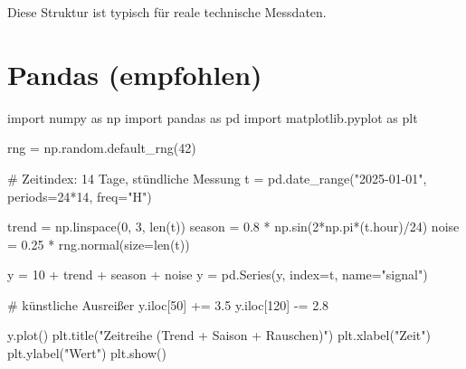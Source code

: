 \documentclass[
  ngerman,
  letterpaper,
  DIV=11]{scrreprt}
\newenvironment{Shaded}{\begin{snugshade}}{\end{snugshade}}
\newcommand{\BuiltInTok}[1]{\textcolor[rgb]{0.00,0.23,0.31}{#1}}
\newcommand{\CommentTok}[1]{\textcolor[rgb]{0.37,0.37,0.37}{#1}}
\newcommand{\DecValTok}[1]{\textcolor[rgb]{0.68,0.00,0.00}{#1}}
\newcommand{\FloatTok}[1]{\textcolor[rgb]{0.68,0.00,0.00}{#1}}
\newcommand{\ImportTok}[1]{\textcolor[rgb]{0.00,0.46,0.62}{#1}}
\newcommand{\NormalTok}[1]{\textcolor[rgb]{0.00,0.23,0.31}{#1}}
\newcommand{\OperatorTok}[1]{\textcolor[rgb]{0.37,0.37,0.37}{#1}}
\newcommand{\StringTok}[1]{\textcolor[rgb]{0.13,0.47,0.30}{#1}}
\begin{document}
Diese Struktur ist typisch für reale technische Messdaten.

\section{Pandas (empfohlen)}

\begin{Shaded}
\begin{Highlighting}[]
\ImportTok{import}\NormalTok{ numpy }\ImportTok{as}\NormalTok{ np}
\ImportTok{import}\NormalTok{ pandas }\ImportTok{as}\NormalTok{ pd}
\ImportTok{import}\NormalTok{ matplotlib.pyplot }\ImportTok{as}\NormalTok{ plt}

\NormalTok{rng }\OperatorTok{=}\NormalTok{ np.random.default\_rng(}\DecValTok{42}\NormalTok{)}

\CommentTok{\# Zeitindex: 14 Tage, stündliche Messung}
\NormalTok{t }\OperatorTok{=}\NormalTok{ pd.date\_range(}\StringTok{"2025{-}01{-}01"}\NormalTok{, periods}\OperatorTok{=}\DecValTok{24}\OperatorTok{*}\DecValTok{14}\NormalTok{, freq}\OperatorTok{=}\StringTok{"H"}\NormalTok{)}

\NormalTok{trend }\OperatorTok{=}\NormalTok{ np.linspace(}\DecValTok{0}\NormalTok{, }\DecValTok{3}\NormalTok{, }\BuiltInTok{len}\NormalTok{(t))}
\NormalTok{season }\OperatorTok{=} \FloatTok{0.8} \OperatorTok{*}\NormalTok{ np.sin(}\DecValTok{2}\OperatorTok{*}\NormalTok{np.pi}\OperatorTok{*}\NormalTok{(t.hour)}\OperatorTok{/}\DecValTok{24}\NormalTok{)}
\NormalTok{noise }\OperatorTok{=} \FloatTok{0.25} \OperatorTok{*}\NormalTok{ rng.normal(size}\OperatorTok{=}\BuiltInTok{len}\NormalTok{(t))}

\NormalTok{y }\OperatorTok{=} \DecValTok{10} \OperatorTok{+}\NormalTok{ trend }\OperatorTok{+}\NormalTok{ season }\OperatorTok{+}\NormalTok{ noise}
\NormalTok{y }\OperatorTok{=}\NormalTok{ pd.Series(y, index}\OperatorTok{=}\NormalTok{t, name}\OperatorTok{=}\StringTok{"signal"}\NormalTok{)}

\CommentTok{\# künstliche Ausreißer}
\NormalTok{y.iloc[}\DecValTok{50}\NormalTok{] }\OperatorTok{+=} \FloatTok{3.5}
\NormalTok{y.iloc[}\DecValTok{120}\NormalTok{] }\OperatorTok{{-}=} \FloatTok{2.8}

\NormalTok{y.plot()}
\NormalTok{plt.title(}\StringTok{"Zeitreihe (Trend + Saison + Rauschen)"}\NormalTok{)}
\NormalTok{plt.xlabel(}\StringTok{"Zeit"}\NormalTok{)}
\NormalTok{plt.ylabel(}\StringTok{"Wert"}\NormalTok{)}
\NormalTok{plt.show()}
\end{Highlighting}
\end{Shaded}
\end{document}
